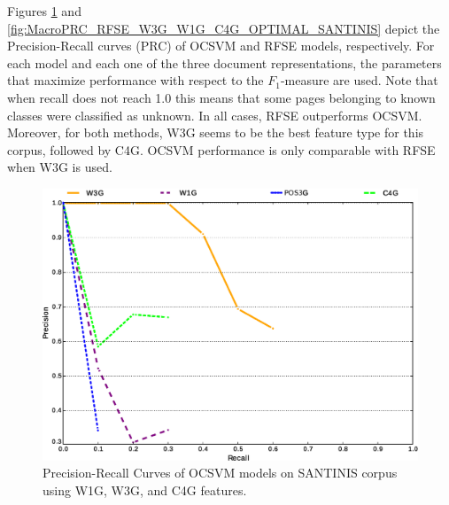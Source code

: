 Figures \ref{fig:MacroPRC_OCSVME_W3G_W1G_C4G_OPTIMAL_SANTINIS} and \ref{fig:MacroPRC_RFSE_W3G_W1G_C4G_OPTIMAL_SANTINIS} depict the Precision-Recall curves (PRC) of OCSVM and RFSE models, respectively. For each model and each one of the three document representations, the parameters that maximize performance with respect to the $F_{1}$-measure are used. Note that when recall does not reach 1.0 this means that some pages belonging to known classes were classified as unknown. In all cases, RFSE outperforms OCSVM. Moreover, for both methods, W3G seems to be the best feature type for this corpus, followed by C4G. OCSVM performance is only comparable with RFSE when W3G is used.

\hfill \break


\begin{figure}[H]
\begin{center}
    \includegraphics[scale=0.38]{diagrams/OCSME_Best_per_DocRep.eps}
	\caption{Precision-Recall Curves of OCSVM models on SANTINIS corpus using W1G, W3G, and C4G features.}
	\label{fig:MacroPRC_OCSVME_W3G_W1G_C4G_OPTIMAL_SANTINIS}
	\end{center}
\end{figure}

